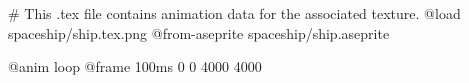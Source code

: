 # This .tex file contains animation data for the associated texture.
@load spaceship/ship.tex.png
@from-aseprite spaceship/ship.aseprite

@anim loop
	@frame 100ms 0 0 4000 4000
